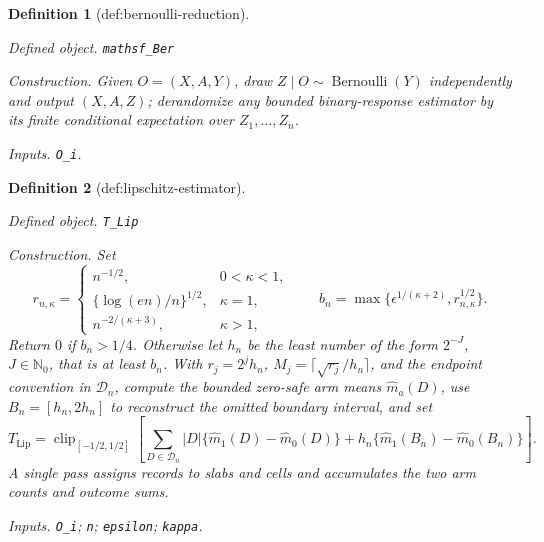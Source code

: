\documentclass{article}
\newtheorem{definition}{Definition}
\begin{document}
\begin{definition}[def:bernoulli-reduction]\label{def:bernoulli-reduction}
\par\smallskip\noindent\emph{Defined object.} \texttt{mathsf\_\allowbreak{}Ber}
\par\smallskip\noindent\emph{Construction.} Given \(O=(X,A,Y)\), draw \(Z\mid O\sim\operatorname{Bernoulli}(Y)\) independently and output \((X,A,Z)\); derandomize any bounded binary-response estimator by its finite conditional expectation over \(Z_1,\ldots,Z_n\).
\par\smallskip\noindent\emph{Inputs.} \texttt{O\_\allowbreak{}i}.
\end{definition}

\begin{definition}[def:lipschitz-estimator]\label{def:lipschitz-estimator}
\par\smallskip\noindent\emph{Defined object.} \texttt{T\_\allowbreak{}Lip}
\par\smallskip\noindent\emph{Construction.} Set
\[
r_{n,\kappa}=
\begin{cases}
n^{-1/2},&0<\kappa<1,\\
\{\log(en)/n\}^{1/2},&\kappa=1,\\
n^{-2/(\kappa+3)},&\kappa>1,
\end{cases}
\qquad
b_n=\max\{\epsilon^{1/(\kappa+2)},r_{n,\kappa}^{1/2}\}.
\]
Return \(0\) if \(b_n>1/4\). Otherwise let \(h_n\) be the least number of the form \(2^{-J}\), \(J\in\mathbb N_0\), that is at least \(b_n\). With \(r_j=2^jh_n\), \(M_j=\lceil\sqrt{r_j}/h_n\rceil\), and the endpoint convention in \(\mathcal D_n\), compute the bounded zero-safe arm means \(\widehat m_a(D)\), use \(B_n=[h_n,2h_n]\) to reconstruct the omitted boundary interval, and set
\[
T_{\mathrm{Lip}}=\operatorname{clip}_{[-1/2,1/2]}
\left[
\sum_{D\in\mathcal D_n}|D|\{\widehat m_1(D)-\widehat m_0(D)\}
+h_n\{\widehat m_1(B_n)-\widehat m_0(B_n)\}
\right].
\]
A single pass assigns records to slabs and cells and accumulates the two arm counts and outcome sums.
\par\smallskip\noindent\emph{Inputs.} \texttt{O\_\allowbreak{}i}; \texttt{n}; \texttt{epsilon}; \texttt{kappa}.
\end{definition}
\end{document}
